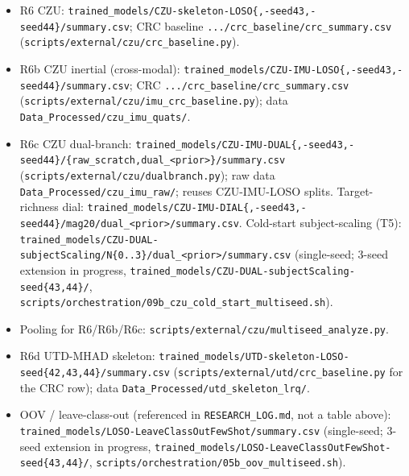 \begin{itemize}
  \item R6 CZU: \texttt{trained\_models/CZU-skeleton-LOSO\{,-seed43,-seed44\}/summary.csv}; CRC baseline \texttt{.../crc\_baseline/crc\_summary.csv} (\texttt{scripts/external/czu/crc\_baseline.py}).
  \item R6b CZU inertial (cross-modal): \texttt{trained\_models/CZU-IMU-LOSO\{,-seed43,-seed44\}/summary.csv}; CRC \texttt{.../crc\_baseline/crc\_summary.csv} (\texttt{scripts/external/czu/imu\_crc\_baseline.py}); data \texttt{Data\_Processed/czu\_imu\_quats/}.
  \item R6c CZU dual-branch: \texttt{trained\_models/CZU-IMU-DUAL\{,-seed43,-seed44\}/\{raw\_scratch,dual\_<prior>\}/summary.csv} (\texttt{scripts/external/czu/dualbranch.py}); raw data \texttt{Data\_Processed/czu\_imu\_raw/}; reuses CZU-IMU-LOSO splits. Target-richness dial: \texttt{trained\_models/CZU-IMU-DIAL\{,-seed43,-seed44\}/mag20/dual\_<prior>/summary.csv}. Cold-start subject-scaling (T5): \texttt{trained\_models/CZU-DUAL-subjectScaling/N\{0..3\}/dual\_<prior>/summary.csv} (single-seed; 3-seed extension in progress, \texttt{trained\_models/CZU-DUAL-subjectScaling-seed\{43,44\}/}, \texttt{scripts/orchestration/09b\_czu\_cold\_start\_multiseed.sh}).
  \item Pooling for R6/R6b/R6c: \texttt{scripts/external/czu/multiseed\_analyze.py}.
  \item R6d UTD-MHAD skeleton: \texttt{trained\_models/UTD-skeleton-LOSO-seed\{42,43,44\}/summary.csv} (\texttt{scripts/external/utd/crc\_baseline.py} for the CRC row); data \texttt{Data\_Processed/utd\_skeleton\_lrq/}.
  \item OOV / leave-class-out (referenced in \texttt{RESEARCH\_LOG.md}, not a table above): \texttt{trained\_models/LOSO-LeaveClassOutFewShot/summary.csv} (single-seed; 3-seed extension in progress, \texttt{trained\_models/LOSO-LeaveClassOutFewShot-seed\{43,44\}/}, \texttt{scripts/orchestration/05b\_oov\_multiseed.sh}).
\end{itemize}
